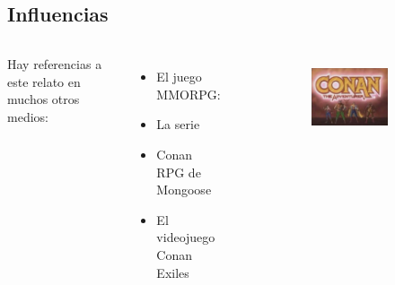 \subsection{Influencias}
\begin{frame}{}
 \begin{columns}
 Hay referencias a este relato en muchos otros medios:
\begin{itemize}
 \item El juego MMORPG: 
 \item La serie 
 \item Conan RPG de Mongoose
 \item El videojuego Conan Exiles
\end{itemize}
\begin{figure}[htp]
 \centering
 \begin{subfigure}[b]{0.3\textwidth}
   \includegraphics[width=\textwidth]{img/otros/Conantheadventurerlogo}
 \end{subfigure}
~
 \begin{subfigure}[b]{0.3\textwidth}

\end{subfigure}
\end{figure}
\end{columns}
\end{frame}
